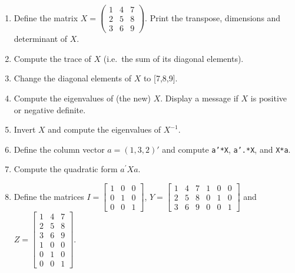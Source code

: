 \begin{enumerate}
\item
Define the matrix \(X=\begin{pmatrix} 1 & 4 & 7 \\ 2 & 5 & 8 \\ 3 & 6 & 9 \end{pmatrix}\).
Print the transpose, dimensions and determinant of \(X\).

\item
Compute the trace of \(X\) (i.e.\ the sum of its diagonal elements).

\item
Change the diagonal elements of \(X\) to [7,8,9].

\item
Compute the eigenvalues of (the new) \(X\).
Display a message if \(X\) is positive or negative definite.

\item
Invert \(X\) and compute the eigenvalues of \(X^{-1}\).

\item
Define the column vector \(a = (1,3,2)'\) and compute \texttt{a'*X}, \texttt{a'.*X}, and \texttt{X*a}.

\item
Compute the quadratic form \(a^{\prime }Xa\).

\item
Define the matrices
\(I = \left[\begin{array}{lll} 1 & 0 & 0 \\ 0 & 1 & 0 \\ 0 & 0 & 1 \end{array}\right]\),
\(Y = \left[\begin{array}{lll} 1 & 4 & 7 \\ 2 & 5 & 8 \\ 3 & 6 & 9 \end{array}
            \begin{array}{lll} 1 & 0 & 0 \\ 0 & 1 & 0 \\ 0 & 0 & 1 \end{array}\right]\)
and
\(Z = \left[\begin{array}{lll} 1 & 4 & 7 \\ 2 & 5 & 8 \\ 3 & 6 & 9 \\ 1 & 0 & 0 \\ 0 & 1 & 0 \\ 0 & 0 & 1 \end{array}\right]\).


\end{enumerate}
